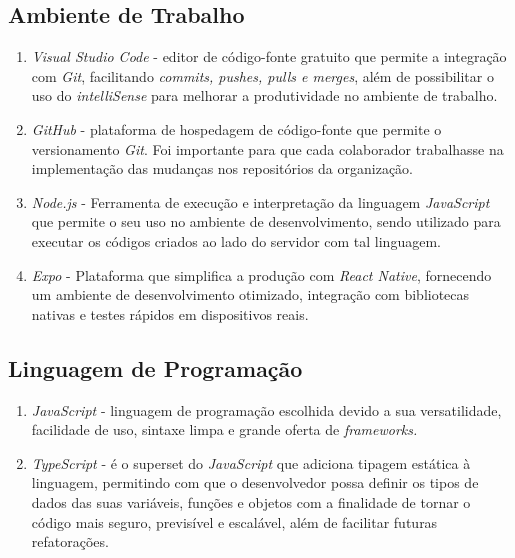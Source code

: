 \subsection{Ambiente de Trabalho}

\begin{enumerate}
	\item\textit{Visual Studio Code} - editor de código-fonte gratuito que permite a integração com \textit{Git}, facilitando \textit{commits, pushes, pulls e merges}, além de possibilitar o uso do \textit{intelliSense} para melhorar a produtividade no ambiente de trabalho.
	
	\item \textit{GitHub} -  plataforma de hospedagem de código-fonte que permite o versionamento \textit{Git}. Foi importante para que cada colaborador trabalhasse na implementação das mudanças nos repositórios da organização.
	
	\item \textit{Node.js} -  Ferramenta de execução e interpretação da linguagem \textit{JavaScript} que permite o seu uso no ambiente de desenvolvimento, sendo utilizado para executar os códigos criados ao lado do servidor com tal linguagem.
	
	\item \textit{Expo} - Plataforma que simplifica a produção com \textit{React Native}, fornecendo um ambiente de desenvolvimento otimizado, integração com bibliotecas nativas e testes rápidos em dispositivos reais.
\end{enumerate}


\subsection{Linguagem de Programação}

\begin{enumerate}
	\item \textit{JavaScript} -   linguagem de programação escolhida devido a sua  versatilidade, facilidade de uso, sintaxe limpa e grande oferta de \textit{frameworks.}
	\item \textit{TypeScript} - é o superset do \textit{JavaScript} que adiciona tipagem estática à linguagem,  permitindo com que o desenvolvedor possa definir os tipos de dados das suas variáveis, funções e objetos com a finalidade de tornar o código mais seguro, previsível e escalável, além de facilitar futuras refatorações.

\end{enumerate}


